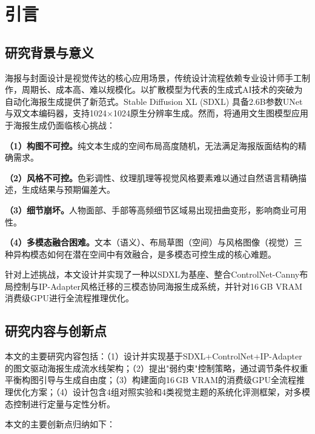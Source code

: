 \documentclass[12pt,a4paper]{ctexart}
\begin{document}
\section{引言}
\label{sec:intro}

\subsection{研究背景与意义}

海报与封面设计是视觉传达的核心应用场景，传统设计流程依赖专业设计师手工制作，周期长、成本高、难以规模化。以扩散模型为代表的生成式AI技术的突破为自动化海报生成提供了新范式。Stable Diffusion XL (SDXL)\cite{podell2023sdxl} 具备2.6B参数UNet与双文本编码器，支持1024$\times$1024原生分辨率生成。然而，将通用文生图模型应用于海报生成仍面临核心挑战：

\textbf{（1）构图不可控。}纯文本生成的空间布局高度随机，无法满足海报版面结构的精确需求。

\textbf{（2）风格不可控。}色彩调性、纹理肌理等视觉风格要素难以通过自然语言精确描述，生成结果与预期偏差大。

\textbf{（3）细节崩坏。}人物面部、手部等高频细节区域易出现扭曲变形，影响商业可用性。

\textbf{（4）多模态融合困难。}文本（语义）、布局草图（空间）与风格图像（视觉）三种异构模态如何在潜在空间中有效融合，是多模态可控生成的核心难题。

针对上述挑战，本文设计并实现了一种以SDXL为基座、整合ControlNet-Canny\cite{zhang2023controlnet}布局控制与IP-Adapter\cite{ye2023ipadapter}风格迁移的三模态协同海报生成系统，并针对16\,GB VRAM消费级GPU进行全流程推理优化。

\subsection{研究内容与创新点}

本文的主要研究内容包括：（1）设计并实现基于SDXL+ControlNet+IP-Adapter的图文驱动海报生成流水线架构；（2）提出"弱约束"控制策略，通过调节条件权重平衡构图引导与生成自由度；（3）构建面向16\,GB VRAM的消费级GPU全流程推理优化方案；（4）设计包含4组对照实验和4类视觉主题的系统化评测框架，对多模态控制进行定量与定性分析。

本文的主要创新点归纳如下：
\end{document}
